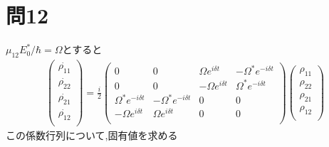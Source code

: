 \documentclass[uplatex,a4j,11pt,dvipdfmx]{jsarticle}
\begin{document}
\section*{問12}
$\mu_{12}E_0^*/\hbar=\Omega$とすると
\begin{align}
  \begin{pmatrix}
    \dot{\rho_{11}}\\
    \dot{\rho_{22}}\\
    \dot{\rho_{21}}\\
    \dot{\rho_{12}}\\
  \end{pmatrix}=\frac{i}{2}
  \begin{pmatrix}
    0&0&\Omega e^{i\delta t}&-\Omega^* e^{-i\delta t}\\
    0&0&-\Omega e^{i\delta t}&\Omega^* e^{-i\delta t}\\
    \Omega^* e^{-i\delta t}&-\Omega^* e^{-i\delta t}&0&0\\
    -\Omega e^{i\delta t}&\Omega e^{i\delta t}&0&0\\
  \end{pmatrix}
  \begin{pmatrix}
    \rho_{11}\\
    \rho_{22}\\
    \rho_{21}\\
    \rho_{12}\\
  \end{pmatrix}
\end{align}
この係数行列について,固有値を求める
\end{document}
